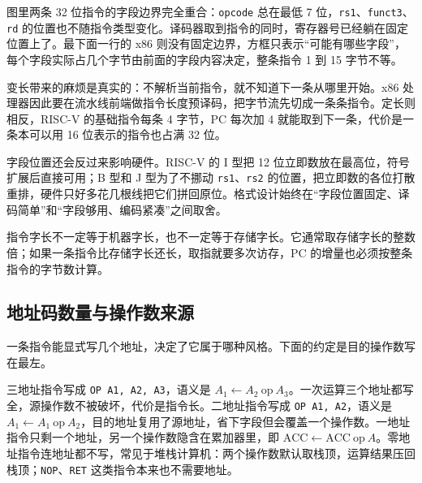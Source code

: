图里两条 32 位指令的字段边界完全重合：\texttt{opcode} 总在最低 7 位，\texttt{rs1}、\texttt{funct3}、\texttt{rd} 的位置也不随指令类型变化。译码器取到指令的同时，寄存器号已经躺在固定位置上了。最下面一行的 x86 则没有固定边界，方框只表示“可能有哪些字段”，每个字段实际占几个字节由前面的字段内容决定，整条指令 1 到 15 字节不等。

变长带来的麻烦是真实的：不解析当前指令，就不知道下一条从哪里开始。x86 处理器因此要在流水线前端做指令长度预译码，把字节流先切成一条条指令。定长则相反，RISC-V 的基础指令每条 4 字节，PC 每次加 4 就能取到下一条，代价是一条本可以用 16 位表示的指令也占满 32 位。

字段位置还会反过来影响硬件。RISC-V 的 I 型把 12 位立即数放在最高位，符号扩展后直接可用；B 型和 J 型为了不挪动 \texttt{rs1}、\texttt{rs2} 的位置，把立即数的各位打散重排，硬件只好多花几根线把它们拼回原位。格式设计始终在“字段位置固定、译码简单”和“字段够用、编码紧凑”之间取舍。

指令字长不一定等于机器字长，也不一定等于存储字长。它通常取存储字长的整数倍；如果一条指令比存储字长还长，取指就要多次访存，PC 的增量也必须按整条指令的字节数计算。

\subsection{地址码数量与操作数来源}

一条指令能显式写几个地址，决定了它属于哪种风格。下面的约定是目的操作数写在最左。

三地址指令写成 \texttt{OP A1, A2, A3}，语义是 $A_1\leftarrow A_2\ \mathrm{op}\ A_3$。一次运算三个地址都写全，源操作数不被破坏，代价是指令长。二地址指令写成 \texttt{OP A1, A2}，语义是 $A_1\leftarrow A_1\ \mathrm{op}\ A_2$，目的地址复用了源地址，省下字段但会覆盖一个操作数。一地址指令只剩一个地址，另一个操作数隐含在累加器里，即 $\mathrm{ACC}\leftarrow \mathrm{ACC}\ \mathrm{op}\ A$。零地址指令连地址都不写，常见于堆栈计算机：两个操作数默认取栈顶，运算结果压回栈顶；\texttt{NOP}、\texttt{RET} 这类指令本来也不需要地址。

